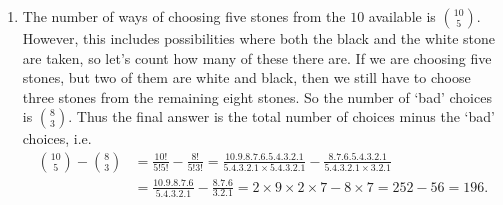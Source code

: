 \documentclass[12pt]{article}
\begin{document}
\begin{enumerate}[topsep=\bigskipamount,itemsep=\bigskipamount]
\item The number of ways of choosing five stones from the $10$ available is $\binom{10}{5}$.
However, this includes possibilities where both the black and the white stone are taken, so let's count how many of these there are.
If we are choosing five stones, but two of them are white and black, then we still have to choose three stones from the remaining eight stones.
So the number of `bad' choices is $\binom{8}{3}$.
Thus the final answer is the total number of choices minus the `bad' choices, i.e.
\begin{align*}
    \binom{10}{5} -\binom{8}{3} &= \frac{10!}{5!5!} -\frac{8!}{5!3!} = \frac{10.9.8.7.6.5.4.3.2.1}{5.4.3.2.1 \times 5.4.3.2.1} -\frac{8.7.6.5.4.3.2.1}{5.4.3.2.1 \times 3.2.1} \\
    &= \frac{10.9.8.7.6}{5.4.3.2.1} -\frac{8.7.6}{3.2.1} = 2 \times 9 \times 2 \times 7 - 8 \times 7 = 252 -56 = 196.
\end{align*}

\end{enumerate}
\end{document}
